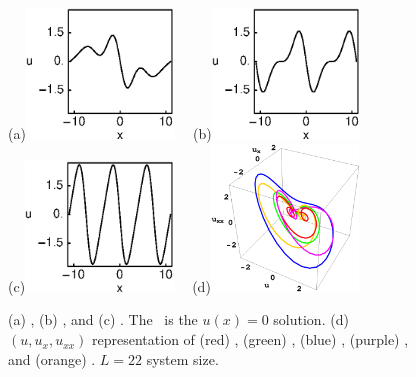 %
\begin{figure}[t]
\begin{center}
  (a)\!\!\includegraphics[width=0.35\textwidth]{figs/1wKS22equil.eps}
~~(b)\!\!\includegraphics[width=0.35\textwidth]{figs/2wKS22equil.eps}
\\
  (c)\!\!\includegraphics[width=0.35\textwidth]{figs/3wKS22equil.eps}
~~(d)\!\!\includegraphics[width=0.35\textwidth]{figs/equilSpatial.eps}
\end{center}
\caption{
(a) , (b) , and (c)
 \eqva. The  \eqv\ is the $u(x)=0$
solution.
(d) $(u,u_x,u_{xx})$ representation
of (red) , (green) ,  (blue)  \eqva,
(purple) ,  and (orange)  \reqva.
$L=22$ system size.
    }
\label{f:KS22Equil}
\end{figure}

